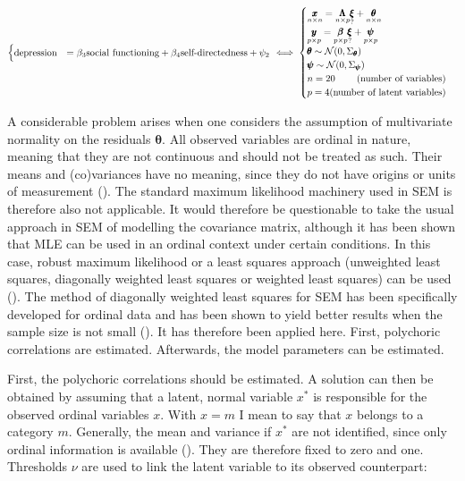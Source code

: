\documentclass[11pt]{article}
\begin{document}
\begin{equation}
\begin{cases}
    \textrm{depression} & = \beta_3 \textrm{social functioning} + \beta_4 \textrm{self-directedness} + \psi_2
    \end{cases}
    \iff
    \begin{cases}
      \underset{n \times n}{\pmb{x}} = \underset{n \times p}{\pmb{\Lambda}} \underset{?}{\pmb{\xi}} + \underset{n \times n}{\pmb{\theta}} \\
      \underset{p \times p}{\pmb{y}} = \underset{p \times p}{\pmb{\beta}} \underset{?}{\pmb{\xi}} + \underset{p \times p}{\pmb{\psi}} \\
      
      \pmb{\theta} \sim \mathcal{N} (0, \Sigma_{\pmb{\theta}}) \\
      \pmb{\psi} \sim \mathcal{N} (0, \Sigma_{\pmb{\psi}}) \\
      
      n = 20 \hfill \text{(number of variables)}        \\
      p = 4  \hfill \text{(number of latent variables)} \\

    \end{cases}
\end{equation}



A considerable problem arises when one considers the assumption of multivariate
normality on the residuals $\pmb{\theta}$. All observed variables are ordinal in
nature, meaning that they are not continuous and should not be treated as such.
Their means and (co)variances have no meaning, since they do not have origins or
units of measurement (\cite{joreskog1994}). The standard maximum likelihood
machinery used in SEM is therefore also not applicable. It would therefore be
questionable to take the usual approach in SEM of modelling the covariance
matrix, although it has been shown that MLE can be used in an ordinal context
under certain conditions. In this case, robust maximum likelihood or a least
squares approach (unweighted least squares, diagonally weighted least squares or
weighted least squares) can be used (\cite{yangwallentin2010}). The method of
diagonally weighted least squares for SEM has been specifically developed for
ordinal data and has been shown to yield better results when the sample size is
not small (\cite{li2016}). It has therefore been applied here. First, polychoric
correlations are estimated. Afterwards, the model parameters can be estimated. 

First, the polychoric correlations should be estimated. A solution can then be
obtained by assuming that a latent, normal variable $x^*$ is responsible for the
observed ordinal variables $x$. With $x=m$ I mean to say that $x$ belongs to a
category $m$. Generally, the mean and variance if $x^*$ are not identified,
since only ordinal information is available (\cite{simsek2012}). They are
therefore fixed to zero and one. Thresholds $\nu$ are used to link the latent
variable to its observed counterpart:
\end{document}
